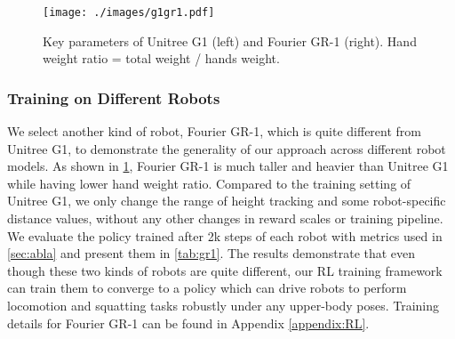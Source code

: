 \begin{figure}[!ht]
\setlength{\belowcaptionskip}{-10pt}
  \centering
  \texttt{[image: ./images/g1gr1.pdf]}
  \caption{Key parameters of Unitree G1 (left) and Fourier GR-1 (right). Hand weight ratio = total weight / hands weight.}
  \label{fig:g1 & gr1}
\end{figure}
\subsubsection{Training on Different Robots}


We select another kind of robot, Fourier GR-1, which is quite different from Unitree G1, to demonstrate the generality of our approach across different robot models. As shown in \cref{fig:g1 & gr1}, Fourier GR-1 is much taller and heavier than Unitree G1 while having lower hand weight ratio. Compared to the training setting of Unitree G1, we only change the range of height tracking and some robot-specific distance values, without any other changes in reward scales or training pipeline. We evaluate the policy trained after 2k steps of each robot with metrics used in \cref{sec:abla} and present them in \cref{tab:gr1}. The results demonstrate that even though these two kinds of robots are quite different, our RL training framework can train them to converge to a policy which can drive robots to perform locomotion and squatting tasks robustly under any upper-body poses. Training details for Fourier GR-1 can be found in Appendix \ref{appendix:RL}.

\begin{table}[!ht]
    \centering
    \caption{Evaluation of different robots trained with our RL training framework}
    \label{tab:gr1}
\end{table}

